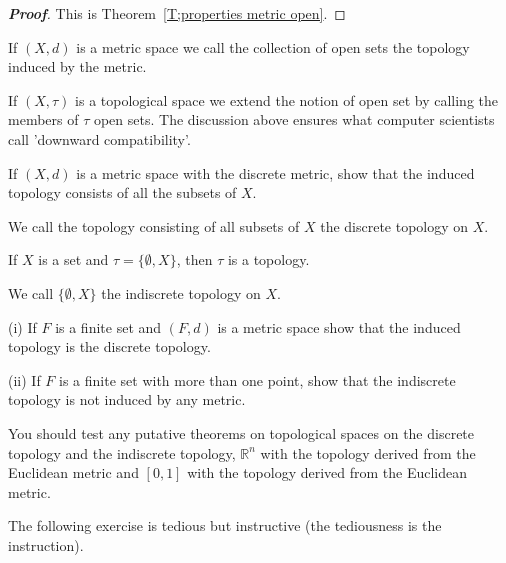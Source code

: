 \begin{proof}[\bf Proof] This is Theorem~\ref{T;properties metric open}.
\end{proof}
If $(X,d)$ is a metric space we call the collection of
open sets the topology induced by the metric.

If $(X,\tau)$ is a topological space we extend the notion of
open set by calling the members of $\tau$ open sets.
The discussion above ensures what computer scientists call
'downward compatibility'.

\begin{exercise} If $(X,d)$ is a metric space with the
discrete metric, show that the induced topology consists
of all the subsets of $X$.
\end{exercise}
We call the topology consisting of all subsets of $X$
the discrete topology on $X$.

\begin{exercise}\label{E;indiscrete} 
If $X$ is a set and $\tau=\{\emptyset,X\}$,
then $\tau$ is a topology.
\end{exercise}
We call $\{\emptyset,X\}$ the indiscrete topology on $X$.

\begin{exercise} (i) If $F$ is a  finite set
and $(F,d)$ is a metric space show that the induced
topology is the discrete topology.

(ii) If $F$ is a finite set with more than one point,
show that the indiscrete topology is not induced by any
metric.
\end{exercise}

You should test any putative theorems on topological spaces
on the discrete topology and the indiscrete topology,
${\mathbb R}^{n}$ with the topology derived from
the Euclidean metric and 
$[0,1]$ with the topology derived from
the Euclidean metric.

The following exercise is tedious but instructive (the tediousness is the instruction).


